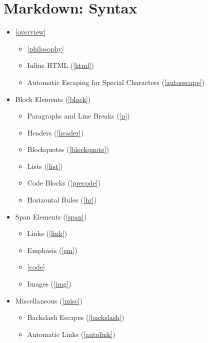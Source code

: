 \part{Markdown: Syntax }
\label{markdown:syntax}

\begin{itemize}
\item{} \autoref{overview}

\begin{itemize}
\item{} \autoref{philosophy}

\item{} Inline HTML (\autoref{html})

\item{} Automatic Escaping for Special Characters (\autoref{autoescape})

\end{itemize}

\item{} Block Elements (\autoref{block})

\begin{itemize}
\item{} Paragraphs and Line Breaks (\autoref{p})

\item{} Headers (\autoref{header})

\item{} Blockquotes (\autoref{blockquote})

\item{} Lists (\autoref{list})

\item{} Code Blocks (\autoref{precode})

\item{} Horizontal Rules (\autoref{hr})

\end{itemize}

\item{} Span Elements (\autoref{span})

\begin{itemize}
\item{} Links (\autoref{link})

\item{} Emphasis (\autoref{em})

\item{} \autoref{code}

\item{} Images (\autoref{img})

\end{itemize}

\item{} Miscellaneous (\autoref{misc})

\begin{itemize}
\item{} Backslash Escapes (\autoref{backslash})

\item{} Automatic Links (\autoref{autolink})

\end{itemize}

\end{itemize}

